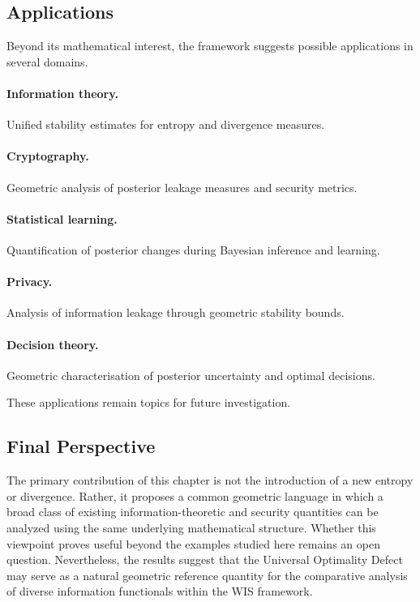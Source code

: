 \subsection{Applications}\label{ch:sec:applications}
Beyond its mathematical interest, the framework suggests possible
applications in several domains.

\paragraph{Information theory.}
Unified stability estimates for entropy and divergence measures.

\paragraph{Cryptography.}
Geometric analysis of posterior leakage measures and security metrics.

\paragraph{Statistical learning.}
Quantification of posterior changes during Bayesian inference and
learning.

\paragraph{Privacy.}
Analysis of information leakage through geometric stability bounds.

\paragraph{Decision theory.}
Geometric characterisation of posterior uncertainty and optimal
decisions.

These applications remain topics for future investigation.

\subsection{Final Perspective}\label{ch:sec:final-perspective}
The primary contribution of this chapter is not the introduction of a
new entropy or divergence.  Rather, it proposes a common geometric
language in which a broad class of existing information-theoretic and
security quantities can be analyzed using the same underlying
mathematical structure.  Whether this viewpoint proves useful beyond the
examples studied here remains an open question.  Nevertheless, the
results suggest that the Universal Optimality Defect may serve as a
natural geometric reference quantity for the comparative analysis of
diverse information functionals within the WIS framework.
